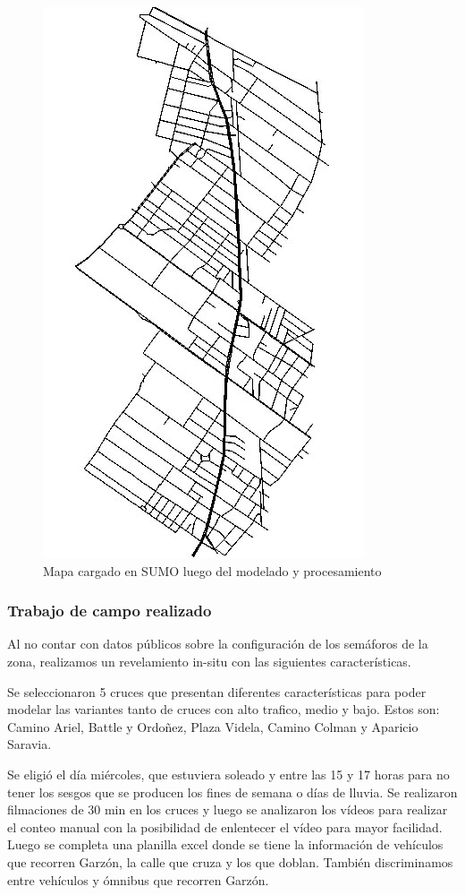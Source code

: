 \begin{figure}[h]
\centering
\includegraphics[width=0.5\linewidth]{Figures/mapa_sumo}
\caption{Mapa cargado en SUMO luego del modelado y procesamiento}
\label{fig:mapa_sumo}
\end{figure}



\subsubsection{Trabajo de campo realizado}
Al no contar con datos públicos sobre la configuración de los semáforos de la zona, realizamos un revelamiento in-situ con las siguientes características.

Se seleccionaron 5 cruces que presentan diferentes características para poder modelar las variantes tanto de cruces con alto trafico, medio y bajo. 
Estos son: Camino Ariel, Battle y Ordoñez, Plaza Videla, Camino Colman y Aparicio Saravia.

Se eligió el día miércoles, que estuviera soleado y entre las 15 y 17 horas para no tener los sesgos que se producen los fines de semana o días de lluvia.
Se realizaron filmaciones de 30 min en los cruces y luego se analizaron los vídeos para realizar el conteo manual con la posibilidad de enlentecer el vídeo para mayor facilidad. Luego se completa una planilla excel donde se tiene la información de vehículos que recorren Garzón, la calle que cruza y los que doblan. También discriminamos entre vehículos y ómnibus que recorren Garzón.

